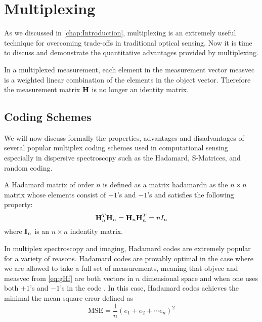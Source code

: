 \section{Multiplexing}

As we discussed in \cref{chap:Introduction}, \gls{multiplexing} is an extremely useful technique for overcoming trade-offs in traditional optical sensing. Now it is time to discuss and demonstrate the quantitative advantages provided by multiplexing. 

In a multiplexed measurement, each element in the measurement vector \gls{measvec} is a weighted linear combination of the elements in the object vector. Therefore the measurement matrix $\mathbf{H}$ is no longer an identity matrix. 



\subsection{Coding Schemes}\label{subsec:codingschemes}

We will now discuss formally the properties, advantages and disadvantages of several popular multiplex coding schemes used in computational sensing especially in dispersive spectroscopy such as the Hadamard, S-Matrices, and random coding. 

A Hadamard matrix of order $n$ is defined as a matrix \gls{hadamardn} as the $n \times n$ matrix whose elements consist of $+1$'s and $-1$'s and satisfies the following property:
\begin{equation}
	\mathbf{H}_{n}^T \mathbf{H}_{n} = \mathbf{H}_{n} \mathbf{H}_{n}^T = n I_{n}
\end{equation}
where $\mathbf{I}_n$ is an $n \times n$ indentity matrix. 

In multiplex spectroscopy and imaging, Hadamard codes are extremely popular for a variety of reasons. Hadamard codes are provably optimal in the case where we are allowed to take a full set of measurements, meaning that \gls{objvec} and \gls{measvec} from \cref{eq:gHf} are both vectors in $n$ dimensional space and when one uses both $+1$'s and $-1$'s in the code \cite{harwit2012hadamard}.  In this case, Hadamard codes achieves the minimal the mean square error defined as
\begin{equation}
	\text{MSE} = \frac{1}{n} ( e_1 + e_2 + \cdots e_n )^2 
\end{equation}

